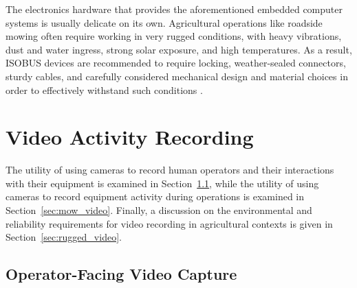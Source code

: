 \documentclass[
]{article}
\begin{document}
The electronics hardware that provides the aforementioned embedded
computer systems is usually delicate on its own. Agricultural operations
like roadside mowing often require working in very rugged conditions,
with heavy vibrations, dust and water ingress, strong solar exposure,
and high temperatures. As a result, ISOBUS devices are recommended to
require locking, weather-sealed connectors, sturdy cables, and carefully
considered mechanical design and material choices in order to
effectively withstand such conditions
\parencite{Pietikaeinen_RemoteIsobusTelematics_2014}.

\section{Video Activity Recording}\label{sec:var}

The utility of using cameras to record human operators and their
interactions with their equipment is examined in
Section~\ref{sec:operator_video}, while the utility of using cameras to
record equipment activity during operations is examined in
Section~\ref{sec:mow_video}. Finally, a discussion on the environmental
and reliability requirements for video recording in agricultural
contexts is given in Section~\ref{sec:rugged_video}.

\subsection{Operator-Facing Video Capture}\label{sec:operator_video}
\end{document}
